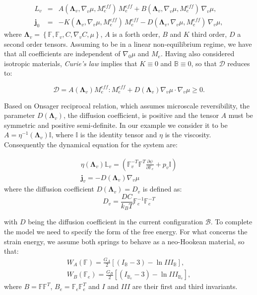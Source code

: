 \documentclass[12pt]{extarticle}
\newcommand{\F}{\ensuremath{\mathbb{F}}}
\newcommand{\B}{\ensuremath{\mathbb{B}}}
\newcommand{\LL}{\ensuremath{\mathbb{L}}}
\begin{document}
\begin{eqnarray}
L_v &=& A(\boldsymbol{\Lambda}_v, \nabla_v \mu, M^{eff}_e)\, M^{eff}_e + B(\boldsymbol{\Lambda}_v,\nabla_v \mu, M^{eff}_e)\, \nabla_v \mu,\\
\mathbf{j}_0 &=& -K(\boldsymbol{\Lambda}_v, \nabla_v \mu, M^{eff}_e) \, M^{eff}_e - D(\boldsymbol{\Lambda}_v, \nabla_v \mu, M^{eff}_e) \, \nabla_v \mu,
\end{eqnarray}
where $\boldsymbol{\Lambda}_v=\left\{\F,\F_v,C,\nabla_v C, \mu\right\}$, $A$ is a forth order, $B$ and $K$ third order, $D$ a second order tensors. Assuming to be in a linear non-equilibrium regime, we have that all coefficients are independent of $\nabla_0 \mu$ and $M_e$. Having also considered isotropic materials, \textit{Curie's law} implies that $K\equiv0$ and $\B\equiv 0$, so that $\mathcal{D}$ reduces to:

\begin{equation*}
\mathcal{D}= A(\boldsymbol{\Lambda}_v) M^{eff}_e : M^{eff}_e  + D(\boldsymbol{\Lambda}_v)\nabla_v \mu\cdot\nabla_v \mu\geq 0 .
\end{equation*}

Based on Onsager reciprocal relation, which assumes microscale reversibility, the parameter $D(\boldsymbol{\Lambda}_v)$, the diffusion coefficient, is positive and the tensor $A$ must be symmetric and positive semi-definite. In our example we consider it to be $A=\eta^{-1}(\boldsymbol{\Lambda}_v) \mathbb{I}$, where $\mathbb{I}$ is the identity tensor and $\eta$ is the viscosity. Consequently the dynamical equation for the system are:

\begin{eqnarray}
\eta(\boldsymbol{\Lambda}_v)\LL_v= \left(\F_v^{-T}\F^{T} \frac{\partial \psi}{\partial \F_e}+p_v\mathbb{I}\right)\\
\mathbf{j}_v = -D(\boldsymbol{\Lambda}_v) \nabla_v \mu
\end{eqnarray}
where the diffusion coefficient $D(\boldsymbol{\Lambda}_v)=D_v$ is defined as:
\begin{equation}
D_v= \frac{DC}{k_BT} \F_e^{-1}\F_e^{-T}
\end{equation}

with $D$ being the diffusion coefficient in the current configuration $\mathcal{B}$.
To complete the model we need to specify the form of the free energy. For what concerns the strain energy, we assume both springs to behave as a neo-Hookean material, so that:
\begin{equation}
\begin{aligned}
W_A(\F) = \frac{G_A}{2} \left[(I_\B-3)-\ln III_\B\right],\\
W_B(\F_e) = \frac{G_B}{2} \left[(I_{\B_e}-3)-\ln III_{\B_e}\right],
\end{aligned}
\end{equation}
where $B=\F\F^T$, $B_e=\F_e\F_e^T$ and $I$ and $III$ are their first and third invariants.
\end{document}
